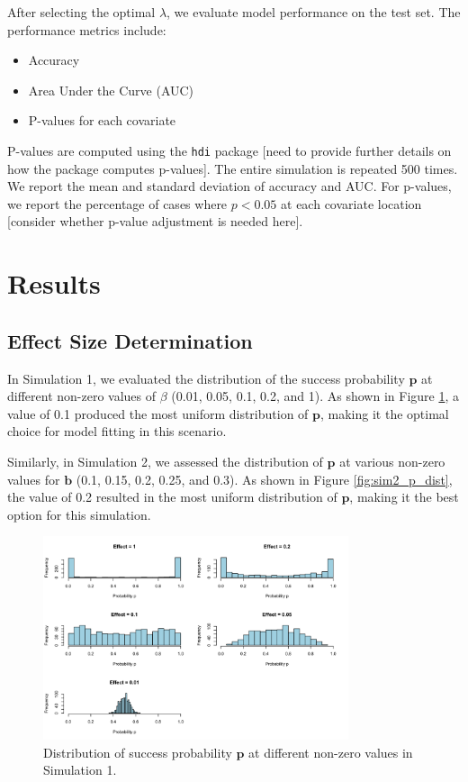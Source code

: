 \documentclass[12pt]{article}
\begin{document}
After selecting the optimal \( \lambda \), we evaluate model performance on the test set. The performance metrics include:
\begin{itemize}
  \item Accuracy
  \item Area Under the Curve (AUC)
  \item P-values for each covariate
\end{itemize}

P-values are computed using the \texttt{hdi} package [need to provide further details on how the package computes p-values]. The entire simulation is repeated 500 times. We report the mean and standard deviation of accuracy and AUC. For p-values, we report the percentage of cases where \( p < 0.05 \) at each covariate location [consider whether p-value adjustment is needed here].


\section*{Results}

\subsection*{Effect Size Determination}

In Simulation 1, we evaluated the distribution of the success probability \( \mathbf{p} \) at different non-zero values of \( \beta \) (0.01, 0.05, 0.1, 0.2, and 1). As shown in Figure \ref{fig:sim1_p_dist}, a value of 0.1 produced the most uniform distribution of \( \mathbf{p} \), making it the optimal choice for model fitting in this scenario.

Similarly, in Simulation 2, we assessed the distribution of \( \mathbf{p} \) at various non-zero values for \( \mathbf{b} \) (0.1, 0.15, 0.2, 0.25, and 0.3). As shown in Figure \ref{fig:sim2_p_dist}, the value of 0.2 resulted in the most uniform distribution of \( \mathbf{p} \), making it the best option for this simulation.

\begin{figure}[h!]
	\centering
	\includegraphics[width=0.8\textwidth]{sim1_p_dist.png}
  \caption{Distribution of success probability \( \mathbf{p} \) at different non-zero values in Simulation 1.}
	\label{fig:sim1_p_dist}
\end{figure}
\end{document}
